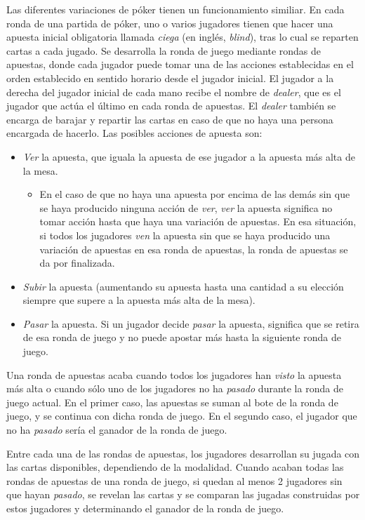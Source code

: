 Las diferentes variaciones de póker tienen un funcionamiento similiar. En cada ronda de una partida de póker, uno o varios jugadores tienen que hacer una apuesta inicial obligatoria llamada \textit{ciega} (en inglés, \textit{blind}), tras lo cual se reparten cartas a cada jugado. Se desarrolla la ronda de juego mediante rondas de apuestas, donde cada jugador puede tomar una de las acciones establecidas en el orden establecido en sentido horario desde el jugador inicial. El jugador a la derecha del jugador inicial de cada mano recibe el nombre de \textit{dealer}, que es el jugador que actúa el último en cada ronda de apuestas. El \textit{dealer} también se encarga de barajar y repartir las cartas en caso de que no haya una persona encargada de hacerlo.\cite{howto}
Las posibles acciones de apuesta son:
\begin{itemize}
\item \textit{Ver} la apuesta, que iguala la apuesta de ese jugador a la apuesta más alta de la mesa.
\begin{itemize}
\item En el caso de que no haya una apuesta por encima de las demás sin que se haya producido ninguna acción de \textit{ver}, \textit{ver} la apuesta significa no tomar acción hasta que haya una variación de apuestas. En esa situación, si todos los jugadores \textit{ven} la apuesta sin que se haya producido una variación de apuestas en esa ronda de apuestas, la ronda de apuestas se da por finalizada.
\end{itemize}
\item \textit{Subir} la apuesta (aumentando su apuesta hasta una cantidad a su elección siempre que supere a la apuesta más alta de la mesa).
\item \textit{Pasar} la apuesta. Si un jugador decide \textit{pasar} la apuesta, significa que se retira de esa ronda de juego y no puede apostar más hasta la siguiente ronda de juego. 
\end{itemize}

Una ronda de apuestas acaba cuando todos los jugadores han \textit{visto} la apuesta más alta o cuando sólo uno de los jugadores no ha \textit{pasado} durante la ronda de juego actual. En el primer caso, las apuestas se suman al bote de la ronda de juego, y se continua con dicha ronda de juego. En el segundo caso, el jugador que no ha \textit{pasado} sería el ganador de la ronda de juego.

Entre cada una de las rondas de apuestas, los jugadores desarrollan su jugada con las cartas disponibles, dependiendo de la modalidad.
Cuando acaban todas las rondas de apuestas de una ronda de juego, si quedan al menos 2 jugadores sin que hayan \textit{pasado}, se revelan las cartas y se comparan las jugadas construidas por estos jugadores y determinando el ganador de la ronda de juego.

